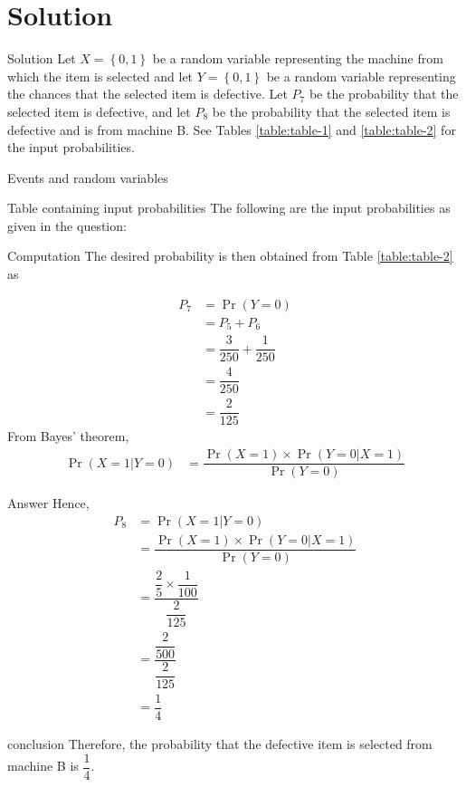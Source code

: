 \documentclass{beamer}
\providecommand{\pr}[1]{\ensuremath{\Pr\left(#1\right)}}
\providecommand{\cbrak}[1]{\ensuremath{\left\{#1\right\}}}
\begin{document}
	\section{Solution}
	\begin{frame}{Solution}
	 Let $X=\cbrak{0,1}$ be a random variable representing the machine from which the item is selected and let $Y=\cbrak{0,1}$ be a random variable representing the chances that the selected item is defective. Let $P_7$ be the probability that the selected item is defective, and let $P_8$ be the probability that the selected item is defective and is from machine B. See Tables 
	\eqref{table:table-1}
	and 
	\eqref{table:table-2} 
	for the input probabilities.
	 	\end{frame}
	 \begin{frame}{Events and random variables}
	\begin{table}[ht!]
		
		\vspace*{5pt}
		\caption{}
		\label{table:table-1}
	\end{table}
	\end{frame}
	\begin{frame}{Table containing input probabilities}
		The following are the input probabilities as given in the question:
		\begin{table}[ht!]
			\centering
			
			\caption{table containing input probabilities}
			\label{table:table-2}	
		\end{table}
	\end{frame}
	\begin{frame}{Computation}
		The desired probability is then obtained from Table \eqref{table:table-2} as
	
	\begin{align}
		P_7 &=\pr{Y=0}\\
		    &=P_5+P_6 \\		
		    &= \dfrac{3}{250}+ \dfrac{1}{250}\\
		    &= \dfrac{4}{250}\\
	     	&= \dfrac{2}{125}
	\end{align}
From Bayes' theorem, 
\begin{align}
\pr{X=1|Y=0}
&=\dfrac{\pr{X=1}\times\pr{Y=0|X=1}}{\pr{Y=0}}
\end{align}

	\end{frame}
	
	\begin{frame}{Answer}
Hence,
\begin{align}
	P_8 &=\pr{X=1|Y=0} \\
	&=\dfrac{\pr{X=1}\times\pr{Y=0|X=1}}{\pr{Y=0}}\\
	&= \dfrac{\dfrac{2}{5}\times\dfrac{1}{100}}{\dfrac{2}{125}}\\
	&= \dfrac{\dfrac{2}{500}}{\dfrac{2}{125}}\\
	&=\dfrac{1}{4}
	\end{align}
	\end{frame}
	\begin{frame}{conclusion}
	Therefore, the probability that the defective item is selected from machine B is $\dfrac{1}{4}$.
	\end{frame}
\end{document}
